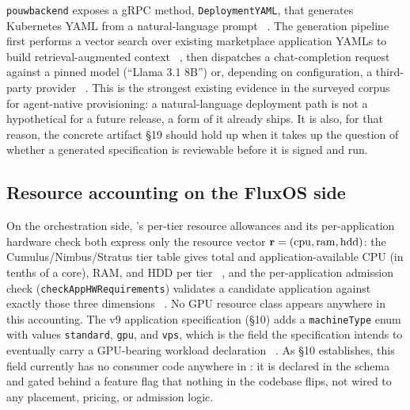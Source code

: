 \texttt{pouwbackend} exposes a gRPC method, \texttt{DeploymentYAML}, that generates Kubernetes YAML
from a natural-language prompt \shipped\ .
The generation pipeline first performs a vector search over existing marketplace application YAMLs
to build retrieval-augmented context \shipped\ ,
then dispatches a chat-completion request against a pinned model (``Llama 3.1 8B'') or, depending on
configuration, a third-party provider \shipped\ . This is
the strongest existing evidence in the surveyed corpus for agent-native provisioning: a natural-language
deployment path is not a hypothetical for a future release, a form of it already ships. It is also,
for that reason, the concrete artifact \S19 should hold up when it takes up the question of whether a
generated specification is reviewable before it is signed and run.

\subsection{Resource accounting on the FluxOS side}
\label{sec:accelerated-compute-fluxos}

On the orchestration side, \FluxOS's per-tier resource allowances and its per-application hardware
check both express only the resource vector $\mathbf{r} = (\mathrm{cpu}, \mathrm{ram}, \mathrm{hdd})$:
the Cumulus/Nimbus/Stratus tier table gives total and application-available CPU (in tenths of a
core), RAM, and HDD per tier \shipped\ , and the
per-application admission check (\texttt{check\allowbreak{}App\allowbreak{}HWRequirements}) validates a candidate application
against exactly those three dimensions \shipped\ .
No GPU resource class appears anywhere in this accounting. The v9 application specification (\S10)
adds a \texttt{machineType} enum with values \texttt{standard}, \texttt{gpu}, and \texttt{vps},
which is the field the specification intends to eventually carry a GPU-bearing workload declaration
\inprogress\ .
As \S10 establishes, this field currently has no consumer code anywhere in \FluxOS
{}: it is declared in the schema and gated behind a feature flag that
nothing in the codebase flips, not wired to any placement, pricing, or admission logic.

